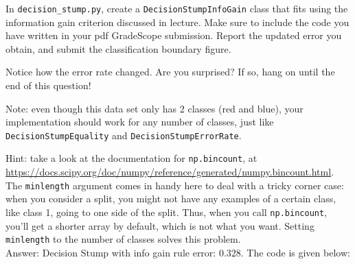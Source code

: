 \documentclass{article}
\def\blu#1{{\color{blu}#1}}
\def\gre#1{{\color{gre}#1}}
\def\ans#1{\gre{Answer: #1}}{}
\begin{document}
In \texttt{decision\string_stump.py}, \blu{create a \texttt{DecisionStumpInfoGain} class that 
fits using the information gain criterion discussed in lecture. Make sure to include the code you have written in your pdf GradeScope submission. Report the updated error you obtain, and submit the classification boundary figure.}

Notice how the error rate changed. Are you surprised? If so, hang on until the end of this question!

Note: even though this data set only has 2 classes (red and blue), your implementation should work 
for any number of classes, just like \texttt{DecisionStumpEquality} and \texttt{DecisionStumpErrorRate}.

Hint: take a look at the documentation for \texttt{np.bincount}, at \\
\url{https://docs.scipy.org/doc/numpy/reference/generated/numpy.bincount.html}. 
The \texttt{minlength} argument comes in handy here to deal with a tricky corner case:
when you consider a split, you might not have any examples of a certain class, like class 1,
going to one side of the split. Thus, when you call \texttt{np.bincount}, you'll get
a shorter array by default, which is not what you want. Setting \texttt{minlength} to the 
number of classes solves this problem. \\

\ans{Decision Stump with info gain rule error: $0.328$. The code is given below:}
\end{document}
